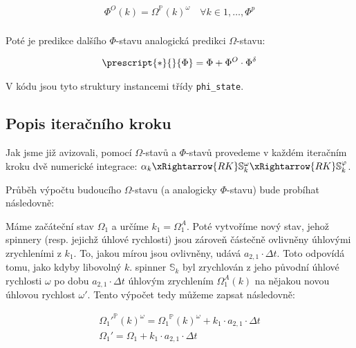 \begin{equation}
    \label{eq:sim_equations_formalized6}
    \begin{gathered}
        \Phi^O(k) = {\Omega}^{\mathbb{P}}(k)^{\omega}
        \quad
        \forall k \in {1, \ldots, \Phi^{p}} \\
    \end{gathered}
\end{equation}

Poté je predikce dalšího $\Phi$-stavu analogická predikci $\Omega$-stavu:

\begin{equation}
    \label{eq:sim_equations_formalized7}
    \begin{gathered}
        \prescript{*}{}{\Phi} = \Phi + \Phi^O \cdot \Phi^{\delta}
    \end{gathered}
\end{equation}

V kódu jsou tyto struktury instancemi třídy \texttt{phi\_state}.

\subsection{Popis iteračního kroku}

Jak jsme již avizovali, pomocí $\Omega$-stavů a $\Phi$-stavů provedeme v každém iteračním kroku dvě numerické integrace: $\alpha_k \xRightarrow{RK} \mathbb{S}_k^{\omega}  \xRightarrow{RK} \mathbb{S}_k^{\varphi}$.

Průběh výpočtu budoucího $\Omega$-stavu (a analogicky $\Phi$-stavu) bude probíhat následovně:

Máme začáteční stav $\Omega_1$ a určíme $k_1 = \Omega_1^A$.
Poté vytvoříme nový stav, jehož spinnery (resp. jejichž úhlové rychlosti) jsou zároveň částečně ovlivněny úhlovými zrychleními z $k_1$.
To, jakou mírou jsou ovlivněny, udává $a_{2, 1} \cdot \Delta t$.
Toto odpovídá tomu, jako kdyby libovolný $k$. spinner $\mathbb{S}_k$ byl zrychlován z jeho původní úhlové rychlosti $\omega$ po dobu $a_{2, 1} \cdot \Delta t$ úhlovým zrychlením $\Omega_1^A(k)$ na nějakou novou úhlovou rychlost $\omega'$.
Tento výpočet tedy můžeme zapsat následovně:

\begin{equation}
    \label{eq:sim_equations_formalized8}
    \begin{gathered}
        {\Omega_1'}^{\mathbb{P}} (k) ^{\omega} = {\Omega_1}^{\mathbb{P}} (k) ^{\omega} + k_1 \cdot a_{2, 1} \cdot \Delta t \\
        {\Omega_1'} = {\Omega_1} + k_1 \cdot a_{2, 1} \cdot \Delta t
    \end{gathered}
\end{equation}

